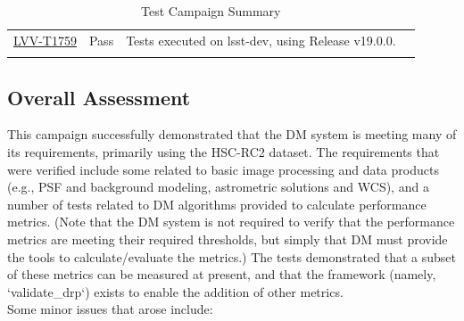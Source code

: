 \documentclass[DM,lsstdraft,STR,toc]{lsstdoc}
\begin{document}
\begin{longtable}{p{2cm}p{2.5cm}p{9cm}p{2.5cm}}
\begin{minipage}[]{9cm}
    \medskip
    \end{minipage}
    &
    \\\hline
\href{https://jira.lsstcorp.org/secure/Tests.jspa#/testCase/LVV-T1759}{LVV-T1759}
    & Pass &
    \begin{minipage}[]{9cm}
    \smallskip
     Tests executed on lsst-dev, using Release v19.0.0.

    \medskip
    \end{minipage}
    &
    \\\hline
\caption{Test Campaign Summary}
\label{table:summary}
\end{longtable}

\subsection{Overall Assessment}
\label{sect:overallassessment}

 This campaign successfully demonstrated that the DM system is meeting
many of its requirements, primarily using the HSC-RC2 dataset. The
requirements that were verified include some related to basic image
processing and data products (e.g., PSF and background modeling,
astrometric solutions and WCS), and a number of tests related to DM
algorithms provided to calculate performance metrics. (Note that the DM
system is not required to verify that the performance metrics are
meeting their required thresholds, but simply that DM must provide the
tools to calculate/evaluate the metrics.) The tests demonstrated that a
subset of these metrics can be measured at present, and that the
framework (namely, `validate\_drp`) exists to enable the addition of
other metrics.\\[2\baselineskip]Some minor issues that arose include:
\end{document}
